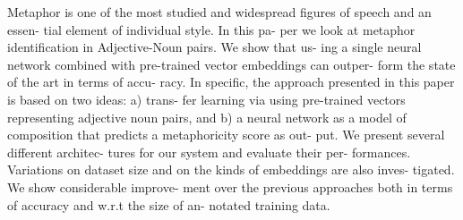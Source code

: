Metaphor is one of the most studied and widespread figures of speech and an essen- tial element of individual style. In this pa- per we look at metaphor identification in Adjective-Noun pairs. We show that us- ing a single neural network combined with pre-trained vector embeddings can outper- form the state of the art in terms of accu- racy. In specific, the approach presented in this paper is based on two ideas: a) trans- fer learning via using pre-trained vectors representing adjective noun pairs, and b) a neural network as a model of composition that predicts a metaphoricity score as out- put. We present several different architec- tures for our system and evaluate their per- formances. Variations on dataset size and on the kinds of embeddings are also inves- tigated. We show considerable improve- ment over the previous approaches both in terms of accuracy and w.r.t the size of an- notated training data.
